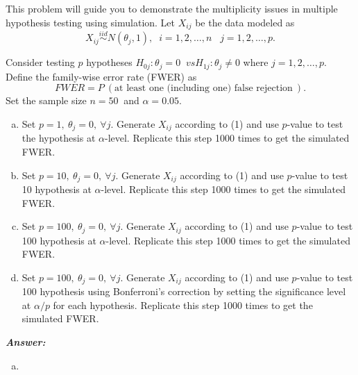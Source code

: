\documentclass[12pt]{article}
\newenvironment{question}[2][Question]{\begin{trivlist}
\item[\hskip \labelsep {\bfseries #1}\hskip \labelsep {\bfseries #2.}]}{\end{trivlist}}
\begin{document}
\bigskip
\bigskip
 \begin{question}{7.3}This problem will guide you to demonstrate the multiplicity issues in multiple hypothesis testing using simulation. Let $X_{ij}$ be the data modeled as
\begin{equation}
X_{ij} \stackrel{iid}{\sim} N( \theta_j, 1 ), \; \; i = 1, 2, \dots , n \; \; \; j = 1,2,\dots, p.
\end{equation}

Consider testing $p$ hypotheses $H_{0j} : \theta_j = 0 \; \; vs H_{1j} : \theta_j \neq 0$ where $j = 1, 2, \dots, p$. Define the family-wise error rate (FWER) as
$$
FWER = P\ ( \text{at least one (including one) false rejection} \ ).
$$
Set the sample size $n = 50\ $ and $\alpha = 0.05$.
\begin{enumerate}[(a)]
\item Set $p = 1, \ \theta_j = 0,\  \forall j$. Generate $X_{ij}$ according to (1) and use $p$-value to test the hypothesis at $\alpha$-level. Replicate this step 1000 times to get the simulated FWER.
\item  Set $p = 10, \ \theta_j = 0,\  \forall j$. Generate $X_{ij}$ according to (1) and use $p$-value to test 10 hypothesis at $\alpha$-level. Replicate this step 1000 times to get the simulated FWER.
\item  Set $p = 100, \ \theta_j = 0, \ \forall j$. Generate $X_{ij}$ according to (1) and use $p$-value to test 100 hypothesis at $\alpha$-level. Replicate this step 1000 times to get the simulated FWER.
\item  Set $p = 100, \ \theta_j = 0, \ \forall j$. Generate $X_{ij}$ according to (1) and use $p$-value to test 100 hypothesis using Bonferroni's correction by setting the significance level at $\alpha / p$ for each hypothesis.  Replicate this step 1000 times to get the simulated FWER.

\end{enumerate}

\end{question} 


  \textbf{\color{TealBlue}\emph{Answer:} } 
 
\begin{enumerate}[(a)]


\item 
\end{enumerate}
\end{document}
